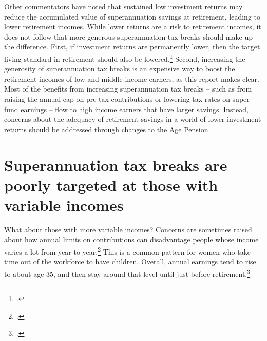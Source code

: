 Other commentators have noted that sustained low investment returns may reduce the accumulated value of superannuation savings at retirement, leading to lower retirement incomes.  While lower returns are a risk to retirement incomes, it does not follow that more generous superannuation tax breaks should make up the difference. First, if investment returns are permanently lower, then the target living standard in retirement should also be lowered.\footcites[][9]{ActuariesInstitute2015RetirementIncomes}{Blayney2015} Second, increasing the generosity of superannuation tax breaks is an expensive way to boost the retirement incomes of low and middle-income earners, as this report makes clear. Most of the benefits from increasing superannuation tax breaks – such as from raising the annual cap on pre-tax contributions or lowering tax rates on super fund earnings – flow to high income earners that have larger savings. Instead, concerns about the adequacy of retirement savings in a world of lower investment returns should be addressed through changes to the Age Pension.

\section{Superannuation tax breaks are poorly targeted at those with variable incomes\label{sec:SUPER-3-4}}
What about those with more variable incomes? Concerns are sometimes raised about how annual limits on contributions can disadvantage people whose income varies a lot from year to year.\footcite[][5]{ASFA2015b} This is a common pattern for women who take time out of the workforce to have children. Overall, annual earnings tend to rise to about age 35, and then stay around that level until just before retirement.\footcite[][18,19,49--50]{DaleyWoodWeidmannEtAl2014}  

